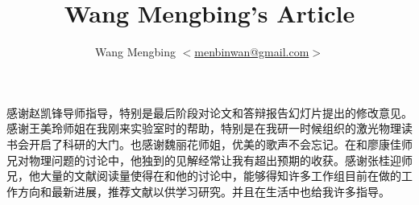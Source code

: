\documentclass[a4paper, 12pt]{book}
\title{Wang Mengbing's Article}
\author{Wang Mengbing $<$\href{mailto:menbinwan@gmail.com}%
            {menbinwan@gmail.com}$>$}
\begin{document}


\thispagestyle{empty}
\frontmatter

{}
\tableofcontents





\mainmatter


%

%

%

%

%






\appendix  

\renewcommand{\thechapter}{附录{\Alph{chapter}}}

\backmatter{}

{}






感谢赵凯锋导师指导，特别是最后阶段对论文和答辩报告幻灯片提出的修改意见。感谢王美玲师姐在我刚来实验室时的帮助，特别是在我研一时候组织的激光物理读书会开启了科研的大门。也感谢魏丽花师姐，优美的歌声不会忘记。在和廖康佳师兄对物理问题的讨论中，他独到的见解经常让我有超出预期的收获。感谢张桂迎师兄，他大量的文献阅读量使得在和他的讨论中，能够得知许多工作组目前在做的工作方向和最新进展，推荐文献以供学习研究。并且在生活中也给我许多指导。
\end{document}
